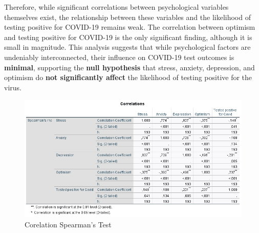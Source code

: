 \documentclass[a4paper]{article}
\begin{document}
\vspace{0.5em}\newline
Therefore, while significant correlations between psychological variables themselves exist, the relationship between these variables and the likelihood of testing positive for COVID-19 remains weak.
The correlation between optimism and testing positive for COVID-19 is the only significant finding, although it is small in magnitude.
\vspace{0.5em}\newline
This analysis suggests that while psychological factors are undeniably interconnected, their influence on COVID-19 test outcomes is \textbf{minimal}, supporting the \textbf{null hypothesis} that stress, anxiety,
depression, and optimism do \textbf{not significantly affect} the likelihood of testing positive for the virus.
\vspace{1.5em}


\begin{figure}[ht]
  \centering
  \caption{Corelation Spearman's Test}
  \label{fig:correlationsTest}
  \includegraphics[width=\textwidth]{img/correlations.png}  %
\end{figure}
\end{document}
